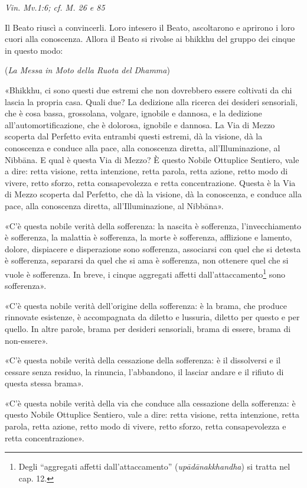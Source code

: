 \emph{Vin. Mv.1:6; cf. M. 26 e 85}


Il Beato riuscì a convincerli. Loro intesero il Beato, ascoltarono e
aprirono i loro cuori alla conoscenza. Allora il Beato si rivolse ai
bhikkhu del gruppo dei cinque in questo modo:


(\emph{La Messa in Moto della Ruota del Dhamma})


«Bhikkhu, ci sono questi due estremi che non dovrebbero essere coltivati
da chi lascia la propria casa. Quali due? La dedizione alla ricerca dei
desideri sensoriali, che è cosa bassa, grossolana, volgare, ignobile e
dannosa, e la dedizione all’automortificazione, che è dolorosa,
ignobile e dannosa. La Via di Mezzo scoperta dal Perfetto evita entrambi
questi estremi, dà la visione, dà la conoscenza e conduce alla pace,
alla conoscenza diretta, all’Illuminazione, al Nibbāna. E qual è questa
Via di Mezzo? È questo Nobile Ottuplice Sentiero, vale a dire: retta
visione, retta intenzione, retta parola, retta azione, retto modo di
vivere, retto sforzo, retta consapevolezza e retta concentrazione.
Questa è la Via di Mezzo scoperta dal Perfetto, che dà la visione, dà la
conoscenza, e conduce alla pace, alla conoscenza diretta,
all’Illuminazione, al Nibbāna».


«C’è questa nobile verità della sofferenza: la nascita è sofferenza,
l’invecchiamento è sofferenza, la malattia è sofferenza, la morte è
sofferenza, afflizione e lamento, dolore, dispiacere e disperazione sono
sofferenza, associarsi con quel che si detesta è sofferenza, separarsi
da quel che si ama è sofferenza, non ottenere quel che si vuole è
sofferenza. In breve, i cinque aggregati affetti
dall’attaccamento\footnote{Degli “aggregati affetti dall’attaccamento” (\emph{upādānakkhandha}) si tratta nel cap. 12.} sono sofferenza».


«C’è questa nobile verità dell’origine della sofferenza: è la brama, che
produce rinnovate esistenze, è accompagnata da diletto e lussuria,
diletto per questo e per quello. In altre parole, brama per desideri
sensoriali, brama di essere, brama di non-essere».


«C’è questa nobile verità della cessazione della sofferenza: è il
dissolversi e il cessare senza residuo, la rinuncia, l’abbandono, il
lasciar andare e il rifiuto di questa stessa brama».


«C’è questa nobile verità della via che conduce alla cessazione della
sofferenza: è questo Nobile Ottuplice Sentiero, vale a dire: retta
visione, retta intenzione, retta parola, retta azione, retto modo di
vivere, retto sforzo, retta consapevolezza e retta concentrazione».


